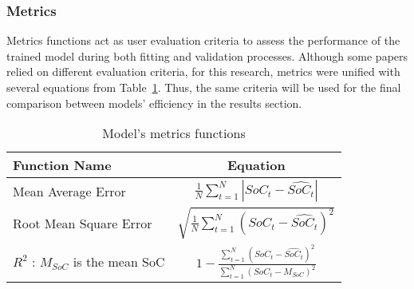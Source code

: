 \subsubsection{Metrics}
Metrics functions act as user evaluation criteria to assess the performance of the trained model during both fitting and validation processes.
Although some papers relied on different evaluation criteria, for this research, metrics were unified with several equations from Table~\ref{tab:metrics}.
Thus, the same criteria will be used for the final comparison between models' efficiency in the results section.
\begin{center}
    \begin{table}[htbp]
    \caption{Model's metrics functions}
    \label{tab:metrics}
\begin{tabular}{l c}
    \hline
    Function Name & Equation \\ 
    \hline
    Mean Average Error &  $\frac{1}{N}\sum\limits^N_{t=1} |SoC_t-\hat{SoC_t}|$ \\
    \hline
    Root Mean Square Error & $ \sqrt{\frac{1}{N}\sum\limits^N_{t=1} \left(SoC_t-\hat{SoC_t} \right)^2}$ \\
    \hline
    $R^2$ : $M_{SoC}$ is the mean SoC & $1-\frac{\sum\limits^N_{t=1}(SoC_t-\hat{SoC_t})^2}
            {\sum\limits^N_{t=1}(SoC_t-M_{SoC})^2}$ \\
    \hline
\end{tabular}
    \end{table}
\end{center}

